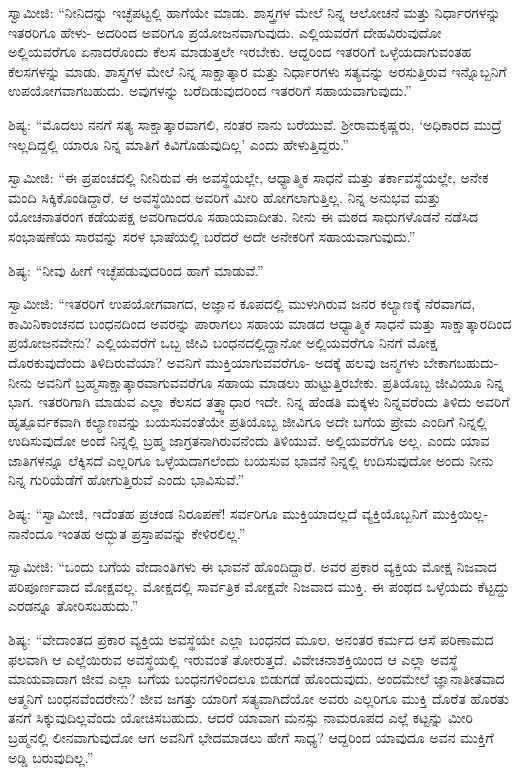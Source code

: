 ಸ್ವಾಮೀಜಿ: “ನೀನಿದನ್ನು ಇಚ್ಛೆಪಟ್ಟಲ್ಲಿ ಹಾಗೆಯೇ ಮಾಡು. ಶಾಸ್ತ್ರಗಳ ಮೇಲೆ ನಿನ್ನ ಆಲೋಚನೆ ಮತ್ತು ನಿರ್ಧಾರಗಳನ್ನು ಇತರರಿಗೂ ಹೇಳು- ಅದರಿಂದ ಅವರಿಗೂ ಪ್ರಯೋಜನವಾಗುವುದು. ಎಲ್ಲಿಯವರೆಗೆ ದೇಹವಿರುವುದೋ ಅಲ್ಲಿಯವರೆಗೂ ಏನಾದರೊಂದು ಕೆಲಸ ಮಾಡುತ್ತಲೇ ಇರಬೇಕು. ಆದ್ದರಿಂದ ಇತರರಿಗೆ ಒಳ್ಳೆಯದಾಗುವಂತಹ ಕೆಲಸಗಳನ್ನು ಮಾಡು. ಶಾಸ್ತ್ರಗಳ ಮೇಲೆ ನಿನ್ನ ಸಾಕ್ಷಾತ್ಕಾರ ಮತ್ತು ನಿರ್ಧಾರಗಳು ಸತ್ಯವನ್ನು ಅರಸುತ್ತಿರುವ ಇನ್ನೊಬ್ಬನಿಗೆ ಉಪಯೋಗವಾಗಬಹುದು. ಅವುಗಳನ್ನು ಬರೆದಿಡುವುದರಿಂದ ಇತರರಿಗೆ ಸಹಾಯವಾಗುವುದು.” 

 ಶಿಷ್ಯ: “ಮೊದಲು ನನಗೆ ಸತ್ಯ ಸಾಕ್ಷಾತ್ಕಾರವಾಗಲಿ, ನಂತರ ನಾನು ಬರೆಯುವೆ. ಶ‍್ರೀರಾಮಕೃಷ್ಣರು, ‘ಅಧಿಕಾರದ ಮುದ್ರೆ ಇಲ್ಲದಿದ್ದಲ್ಲಿ ಯಾರೂ ನಿನ್ನ ಮಾತಿಗೆ ಕಿವಿಗೊಡುವುದಿಲ್ಲ’ ಎಂದು ಹೇಳುತ್ತಿದ್ದರು.” 

 ಸ್ವಾಮೀಜಿ: “ಈ ಪ್ರಪಂಚದಲ್ಲಿ ನೀನಿರುವ ಈ ಅವಸ್ಥೆಯಲ್ಲೇ, ಆಧ್ಯಾತ್ಮಿಕ ಸಾಧನೆ ಮತ್ತು ತರ್ಕಾವಸ್ಥೆಯಲ್ಲೇ, ಅನೇಕ ಮಂದಿ ಸಿಕ್ಕಿಕೊಂಡಿದ್ದಾರೆ. ಆ ಅವಸ್ಥೆಯಿಂದ ಅವರಿಗೆ ಮೀರಿ ಹೋಗಲಾಗುತ್ತಿಲ್ಲ. ನಿನ್ನ ಅನುಭವ ಮತ್ತು ಯೋಚನಾತರಂಗ ಕಡೆಯಪಕ್ಷ ಅವರಿಗಾದರೂ ಸಹಾಯವಾದೀತು. ನೀನು ಈ ಮಠದ ಸಾಧುಗಳೊಡನೆ ನಡೆಸಿದ ಸಂಭಾಷಣೆಯ ಸಾರವನ್ನು ಸರಳ ಭಾಷೆಯಲ್ಲಿ ಬರೆದರೆ ಅದೇ ಅನೇಕರಿಗೆ ಸಹಾಯವಾಗುವುದು.” 

 ಶಿಷ್ಯ: “ನೀವು ಹೀಗೆ ಇಚ್ಛೆಪಡುವುದರಿಂದ ಹಾಗೆ ಮಾಡುವೆ.” 

 ಸ್ವಾಮೀಜಿ: “ಇತರರಿಗೆ ಉಪಯೋಗವಾಗದ, ಅಜ್ಞಾನ ಕೂಪದಲ್ಲಿ ಮುಳುಗಿರುವ ಜನರ ಕಲ್ಯಾಣಕ್ಕೆ ನೆರವಾಗದ, ಕಾಮಿನಿಕಾಂಚನದ ಬಂಧನದಿಂದ ಅವರನ್ನು ಪಾರಾಗಲು ಸಹಾಯ ಮಾಡದ ಆಧ್ಯಾತ್ಮಿಕ ಸಾಧನೆ ಮತ್ತು ಸಾಕ್ಷಾತ್ಕಾರದಿಂದ ಪ್ರಯೋಜನವೇನು? ಎಲ್ಲಿಯವರೆಗೆ ಒಬ್ಬ ಜೀವಿ ಬಂಧನದಲ್ಲಿದ್ದಾನೋ ಅಲ್ಲಿಯವರೆಗೂ ನಿನಗೆ ಮೋಕ್ಷ ದೊರಕುವುದೆಂದು ತಿಳಿದಿರುವೆಯಾ? ಅವನಿಗೆ ಮುಕ್ತಿಯಾಗುವವರೆಗೂ- ಅದಕ್ಕೆ ಹಲವು ಜನ್ಮಗಳು ಬೇಕಾಗಬಹುದು- ನೀನು ಅವನಿಗೆ ಬ್ರಹ್ಮಸಾಕ್ಷಾತ್ಕಾರವಾಗುವವರೆಗೂ ಸಹಾಯ ಮಾಡಲು ಹುಟ್ಟುತ್ತಿರಬೇಕು. ಪ್ರತಿಯೊಬ್ಬ ಜೀವಿಯೂ ನಿನ್ನ ಭಾಗ. ಇತರರಿಗಾಗಿ ಮಾಡುವ ಎಲ್ಲಾ ಕೆಲಸದ ತತ್ತ್ವಾಧಾರ ಇದೇ. ನಿನ್ನ ಹೆಂಡತಿ ಮಕ್ಕಳು ನಿನ್ನವರೆಂದು ತಿಳಿದು ಅವರಿಗೆ ಹೃತ್ಪೂರ್ವಕವಾಗಿ ಕಲ್ಯಾಣವನ್ನು ಬಯಸುವಂತೆಯೇ ಪ್ರತಿಯೊಬ್ಬ ಜೀವಿಗೂ ಅದೇ ಬಗೆಯ ಪ್ರೇಮ ಎಂದಿಗೆ ನಿನ್ನಲ್ಲಿ ಉದಿಸುವುದೋ ಅಂದೆ ನಿನ್ನಲ್ಲಿ ಬ್ರಹ್ಮ ಜಾಗ್ರತನಾಗಿರುವನೆಂದು ತಿಳಿಯುವೆ. ಅಲ್ಲಿಯವರೆಗೂ ಅಲ್ಲ. ಎಂದು ಯಾವ ಜಾತಿಗಳನ್ನೂ ಲೆಕ್ಕಿಸದೆ ಎಲ್ಲರಿಗೂ ಒಳ್ಳೆಯದಾಗಲೆಂದು ಬಯಸುವ ಭಾವನೆ ನಿನ್ನಲ್ಲಿ ಉದಿಸುವುದೋ ಅಂದು ನೀನು ನಿನ್ನ ಗುರಿಯೆಡೆಗೆ ಹೋಗುತ್ತಿರುವೆ ಎಂದು ಭಾವಿಸುವೆ.” 

 ಶಿಷ್ಯ: “ಸ್ವಾಮೀಜಿ, ಇದೆಂತಹ ಪ್ರಚಂಡ ನಿರೂಪಣೆ! ಸರ್ವರಿಗೂ ಮುಕ್ತಿಯಾದಲ್ಲದೆ ವ್ಯಕ್ತಿಯೊಬ್ಬನಿಗೆ ಮುಕ್ತಿಯಿಲ್ಲ- ನಾನೆಂದೂ ಇಂತಹ ಅದ್ಭುತ ಪ್ರಸ್ತಾಪವನ್ನು ಕೇಳಿರಲಿಲ್ಲ.” 

 ಸ್ವಾಮೀಜಿ: “ಒಂದು ಬಗೆಯ ವೇದಾಂತಿಗಳು ಈ ಭಾವನೆ ಹೊಂದಿದ್ದಾರೆ. ಅವರ ಪ್ರಕಾರ ವ್ಯಕ್ತಿಯ ಮೋಕ್ಷ ನಿಜವಾದ ಪರಿಪೂರ್ಣವಾದ ಮೋಕ್ಷವಲ್ಲ. ಮೋಕ್ಷದಲ್ಲಿ ಸಾರ್ವತ್ರಿಕ ಮೋಕ್ಷವೇ ನಿಜವಾದ ಮುಕ್ತಿ. ಈ ಪಂಥದ ಒಳ್ಳೆಯದು ಕೆಟ್ಟದ್ದು ಎರಡನ್ನೂ ತೋರಿಸಬಹುದು.” 

 ಶಿಷ್ಯ: “ವೇದಾಂತದ ಪ್ರಕಾರ ವ್ಯಕ್ತಿಯ ಅವಸ್ಥೆಯೇ ಎಲ್ಲಾ ಬಂಧನದ ಮೂಲ. ಅನಂತರ ಕರ್ಮದ ಆಸೆ ಪರಿಣಾಮದ ಫಲವಾಗಿ ಆ ಎಲ್ಲೆಯಿರುವ ಅವಸ್ಥೆಯಲ್ಲಿ ಇರುವಂತೆ ತೋರುತ್ತದೆ. ವಿವೇಚನಾಶಕ್ತಿಯಿಂದ ಆ ಎಲ್ಲಾ ಅವಸ್ಥೆ ಮಾಯವಾದಾಗ ಜೀವ ಎಲ್ಲಾ ಬಗೆಯ ಬಂಧನಗಳಿಂದಲೂ ಬಿಡುಗಡೆ ಹೊಂದುವುದು. ಅಂದಮೇಲೆ ಜ್ಞಾನಾತೀತವಾದ ಆತ್ಮನಿಗೆ ಬಂಧನವೆಂದರೇನು? ಜೀವ ಜಗತ್ತು ಯಾರಿಗೆ ಸತ್ಯವಾಗಿದೆಯೋ ಅವರು ಎಲ್ಲರಿಗೂ ಮುಕ್ತಿ ದೊರೆತ ಹೊರತು ತನಗೆ ಸಿಕ್ಕುವುದಿಲ್ಲವೆಂದು ಯೋಚಿಸಬಹುದು. ಆದರೆ ಯಾವಾಗ ಮನಸ್ಸು ನಾಮರೂಪದ ಎಲ್ಲೆ ಕಟ್ಟನ್ನು ಮೀರಿ ಬ್ರಹ್ಮನಲ್ಲಿ ಲೀನವಾಗುವುದೋ ಆಗ ಅವನಿಗೆ ಭೇದಮಾಡಲು ಹೇಗೆ ಸಾಧ್ಯ? ಆದ್ದರಿಂದ ಯಾವುದೂ ಅವನ ಮುಕ್ತಿಗೆ ಅಡ್ಡಿ ಬರುವುದಿಲ್ಲ.” 

